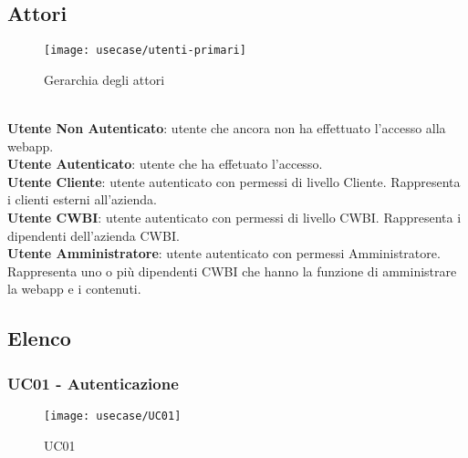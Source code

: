 \subsection{Attori}


\begin{figure}[H]
    \centering 
    \texttt{[image: usecase/utenti-primari]} 
    \caption{Gerarchia degli attori}
\end{figure}

\\
\textbf{Utente Non Autenticato}: utente che ancora non ha effettuato l'accesso alla webapp. 
\\
\textbf{Utente Autenticato}: utente che ha effetuato l'accesso.  
\\ 
\textbf{Utente Cliente}: utente autenticato con permessi di livello Cliente. Rappresenta i clienti esterni all'azienda. 
\\ 
\textbf{Utente CWBI}: utente autenticato con permessi di livello CWBI. Rappresenta i dipendenti dell'azienda CWBI. 
\\
\textbf{Utente Amministratore}: utente autenticato con permessi Amministratore. Rappresenta uno o più dipendenti CWBI che hanno la funzione di amministrare la webapp e i contenuti.  \\


\subsection{Elenco}
\subsubsection{UC01 - Autenticazione}

\begin{figure}[H]
    \centering 
    \texttt{[image: usecase/UC01]}
    \caption{UC01}
\end{figure}

